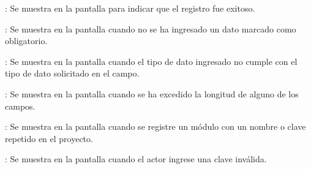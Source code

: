 \begin{Citemize}
	\item {}: Se muestra en la pantalla  para indicar que el registro fue exitoso.
	\item {}: Se muestra en la pantalla  cuando no se ha ingresado un dato marcado como obligatorio.
	\item {}: Se muestra en la pantalla  cuando el tipo de dato ingresado no cumple con el tipo de dato solicitado en el campo.
	\item {}: Se muestra en la pantalla  cuando se ha excedido la longitud de alguno de los campos.
	\item {}: Se muestra en la pantalla  cuando se registre un módulo con un nombre o clave repetido en el proyecto.
	\item {}: Se muestra en la pantalla  cuando el actor ingrese una clave inválida.
\end{Citemize}
